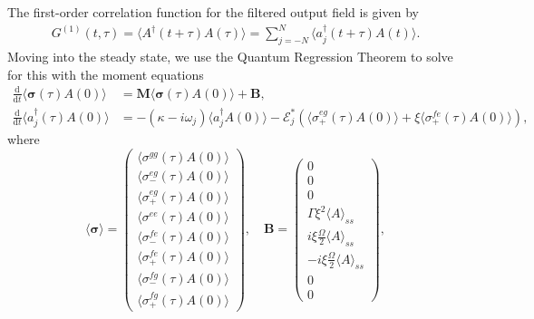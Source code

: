 \documentclass{article}
\newcommand{\ddt}{\frac{\mathrm{d}}{\mathrm{d}t}}
\begin{document}
The first-order correlation function for the filtered output field is given by
\begin{align}
	G^{(1)}(t, \tau) = \langle A^{\dagger}(t + \tau) A(\tau) \rangle = \sum_{j=-N}^{N} \langle a^{\dagger}_{j} (t + \tau) A(t) \rangle.
\end{align}
Moving into the steady state, we use the Quantum Regression Theorem to solve for this with the moment equations
\begin{subequations}
	\begin{align}
		\ddt \langle \bm{\sigma}(\tau) A(0) \rangle &= \bm{M} \langle \bm{\sigma}(\tau) A(0) \rangle + \bm{B}, \\
		\ddt \langle a^{\dagger}_{j}(\tau) A(0) \rangle &= -\left( \kappa - i \omega_{j} \right) \langle a^{\dagger}_{j} A(0) \rangle - \mathcal{E}_{j}^{*} \left( \langle \sigma^{eg}_{+}(\tau) A(0) \rangle + \xi \langle \sigma^{fe}_{+}(\tau) A(0) \rangle \right),
	\end{align}
\end{subequations}
where
\begin{equation}
	\langle \bm{\sigma} \rangle = 
	\begin{pmatrix}
		\langle \sigma^{gg}(\tau) A(0) \rangle \\
		\langle \sigma^{eg}_{-}(\tau) A(0) \rangle \\
		\langle \sigma^{eg}_{+}(\tau) A(0) \rangle \\
		\langle \sigma^{ee}(\tau) A(0) \rangle \\
		\langle \sigma^{fe}_{-}(\tau) A(0) \rangle \\
		\langle \sigma^{fe}_{+}(\tau) A(0) \rangle \\
		\langle \sigma^{fg}_{-}(\tau) A(0) \rangle \\
		\langle \sigma^{fg}_{+}(\tau) A(0) \rangle
	\end{pmatrix}, \quad \bm{B} = 
	\begin{pmatrix}
		0 \\
		0 \\
		0 \\
		\Gamma \xi^{2} \langle A \rangle_{ss} \\
		i \xi \frac{\Omega}{2} \langle A \rangle_{ss} \\
		-i \xi \frac{\Omega}{2} \langle A \rangle_{ss} \\
		0 \\
		0
	\end{pmatrix},
\end{equation}
\end{document}
